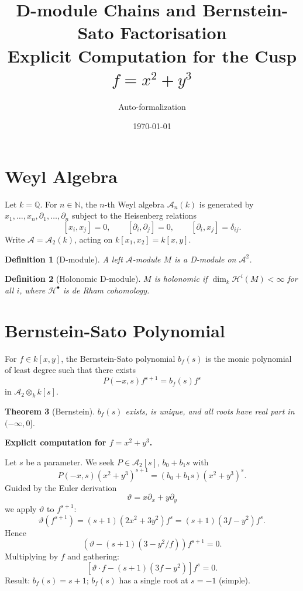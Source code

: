 \documentclass[12pt]{article}
\title{D-module Chains and Bernstein-Sato Factorisation\\
\large Explicit Computation for the Cusp $f = x^2 + y^3$}
\author{Auto-formalization}
\date{\today}
\theoremstyle{plain}
\newtheorem{theorem}{Theorem}[section]
\newtheorem{definition}[theorem]{Definition}
\theoremstyle{remark}
\newcommand{\A}{\mathcal{A}}
\newcommand{\HH}{\mathcal{H}}
\newcommand{\QQ}{\mathbb{Q}}
\newcommand{\NN}{\mathbb{N}}
\newcommand{\vertF}{\vartheta}
\begin{document}
\maketitle

\section{Weyl Algebra}

Let $k = \QQ$. For $n \in \NN$, the $n$-th Weyl algebra
$\A_n(k)$ is generated by $x_1,\dots,x_n, \partial_1,\dots,\partial_n$
subject to the Heisenberg relations
\[
  [x_i, x_j] = 0,\qquad
  [\partial_i, \partial_j] = 0,\qquad
  [\partial_i, x_j] = \delta_{ij}.
\]
Write $\A = \A_2(k)$, acting on $k[x_1,x_2] = k[x,y]$.

\begin{definition}[D-module]
  A left $\A$-module $M$ is a D-module on $\A^2$.
\end{definition}

\begin{definition}[Holonomic D-module]
  $M$ is \emph{holonomic} if $\dim_k \HH^i(M) < \infty$ for
  all $i$, where $\HH^\bullet$ is de Rham cohomology.
\end{definition}

\section{Bernstein-Sato Polynomial}

For $f \in k[x,y]$, the Bernstein-Sato polynomial $b_f(s)$ is
the monic polynomial of least degree such that there exists
\[ P(-x,s) f^{s+1} = b_f(s) f^s \]
in $\A_2 \otimes_k k[s]$.

\begin{theorem}[Bernstein]
  $b_f(s)$ exists, is unique, and all roots have real part
  in $(-\infty,0]$.
\end{theorem}

\textbf{Explicit computation for $f = x^2 + y^3$.}

Let $s$ be a parameter. We seek $P \in \A_2[s]$, $b_0 + b_1 s$ with
\[
  P(-x,s)(x^2+y^3)^{s+1}
  = (b_0 + b_1 s)(x^2+y^3)^s.
\]
Guided by the Euler derivation
\[ \vertF = x\partial_x + y\partial_y \]
we apply $\vertF$ to $f^{s+1}$:
\[
  \vertF(f^{s+1}) = (s+1)(2x^2+3y^2)f^s
                  = (s+1)(3f - y^2)f^s.
\]
Hence
\[
  (\vertF - (s+1)(3-y^2/f))f^{s+1} = 0.
\]
Multiplying by $f$ and gathering:
\[
  [\vertF\cdot f - (s+1)(3f - y^2)]f^s = 0.
\]
Result: $b_f(s) = s+1$; $b_f(s)$ has a single root at
$s=-1$ (simple).
\end{document}
